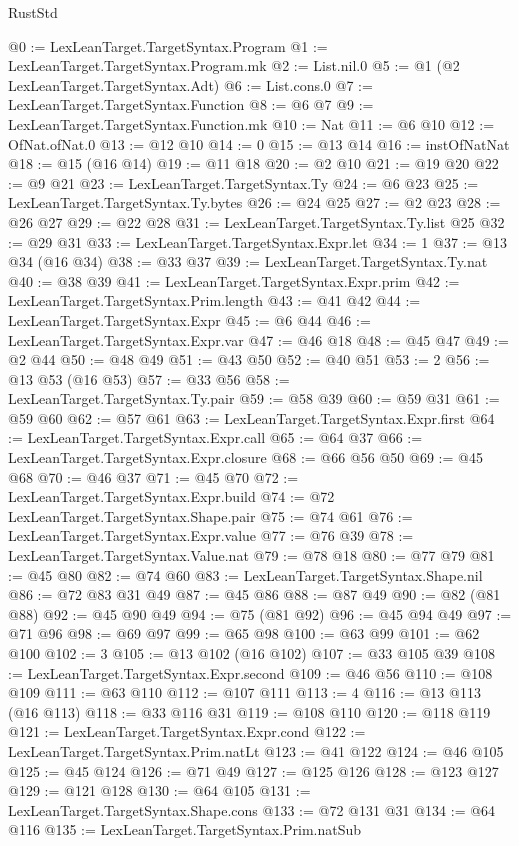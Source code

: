 \begin{lexlean}{RustStd}
\begin{coremodule}
@0 := LexLeanTarget.TargetSyntax.Program
@1 := LexLeanTarget.TargetSyntax.Program.mk
@2 := List.nil.{0}
@5 := @1 (@2 LexLeanTarget.TargetSyntax.Adt)
@6 := List.cons.{0}
@7 := LexLeanTarget.TargetSyntax.Function
@8 := @6 @7
@9 := LexLeanTarget.TargetSyntax.Function.mk
@10 := Nat
@11 := @6 @10
@12 := OfNat.ofNat.{0}
@13 := @12 @10
@14 := 0
@15 := @13 @14
@16 := instOfNatNat
@18 := @15 (@16 @14)
@19 := @11 @18
@20 := @2 @10
@21 := @19 @20
@22 := @9 @21
@23 := LexLeanTarget.TargetSyntax.Ty
@24 := @6 @23
@25 := LexLeanTarget.TargetSyntax.Ty.bytes
@26 := @24 @25
@27 := @2 @23
@28 := @26 @27
@29 := @22 @28
@31 := LexLeanTarget.TargetSyntax.Ty.list @25
@32 := @29 @31
@33 := LexLeanTarget.TargetSyntax.Expr.let
@34 := 1
@37 := @13 @34 (@16 @34)
@38 := @33 @37
@39 := LexLeanTarget.TargetSyntax.Ty.nat
@40 := @38 @39
@41 := LexLeanTarget.TargetSyntax.Expr.prim
@42 := LexLeanTarget.TargetSyntax.Prim.length
@43 := @41 @42
@44 := LexLeanTarget.TargetSyntax.Expr
@45 := @6 @44
@46 := LexLeanTarget.TargetSyntax.Expr.var
@47 := @46 @18
@48 := @45 @47
@49 := @2 @44
@50 := @48 @49
@51 := @43 @50
@52 := @40 @51
@53 := 2
@56 := @13 @53 (@16 @53)
@57 := @33 @56
@58 := LexLeanTarget.TargetSyntax.Ty.pair
@59 := @58 @39
@60 := @59 @31
@61 := @59 @60
@62 := @57 @61
@63 := LexLeanTarget.TargetSyntax.Expr.first
@64 := LexLeanTarget.TargetSyntax.Expr.call
@65 := @64 @37
@66 := LexLeanTarget.TargetSyntax.Expr.closure
@68 := @66 @56 @50
@69 := @45 @68
@70 := @46 @37
@71 := @45 @70
@72 := LexLeanTarget.TargetSyntax.Expr.build
@74 := @72 LexLeanTarget.TargetSyntax.Shape.pair
@75 := @74 @61
@76 := LexLeanTarget.TargetSyntax.Expr.value
@77 := @76 @39
@78 := LexLeanTarget.TargetSyntax.Value.nat
@79 := @78 @18
@80 := @77 @79
@81 := @45 @80
@82 := @74 @60
@83 := LexLeanTarget.TargetSyntax.Shape.nil
@86 := @72 @83 @31 @49
@87 := @45 @86
@88 := @87 @49
@90 := @82 (@81 @88)
@92 := @45 @90 @49
@94 := @75 (@81 @92)
@96 := @45 @94 @49
@97 := @71 @96
@98 := @69 @97
@99 := @65 @98
@100 := @63 @99
@101 := @62 @100
@102 := 3
@105 := @13 @102 (@16 @102)
@107 := @33 @105 @39
@108 := LexLeanTarget.TargetSyntax.Expr.second
@109 := @46 @56
@110 := @108 @109
@111 := @63 @110
@112 := @107 @111
@113 := 4
@116 := @13 @113 (@16 @113)
@118 := @33 @116 @31
@119 := @108 @110
@120 := @118 @119
@121 := LexLeanTarget.TargetSyntax.Expr.cond
@122 := LexLeanTarget.TargetSyntax.Prim.natLt
@123 := @41 @122
@124 := @46 @105
@125 := @45 @124
@126 := @71 @49
@127 := @125 @126
@128 := @123 @127
@129 := @121 @128
@130 := @64 @105
@131 := LexLeanTarget.TargetSyntax.Shape.cons
@133 := @72 @131 @31
@134 := @64 @116
@135 := LexLeanTarget.TargetSyntax.Prim.natSub

\end{coremodule}
\end{lexlean}
